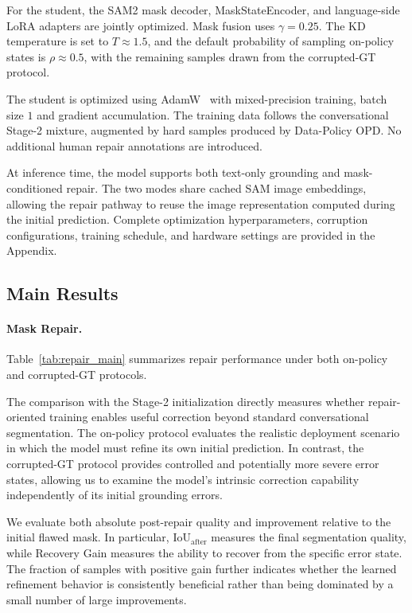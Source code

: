 For the student, the SAM2 mask decoder, MaskStateEncoder, and language-side LoRA adapters are jointly optimized.
Mask fusion uses $\gamma=0.25$.
The KD temperature is set to $T\approx1.5$, and the default probability of sampling on-policy states is $\rho\approx0.5$, with the remaining samples drawn from the corrupted-GT protocol.

The student is optimized using AdamW~\cite{loshchilov2019adamw} with mixed-precision training, batch size $1$ and gradient accumulation.
The training data follows the conversational Stage-2 mixture, augmented by hard samples produced by Data-Policy OPD.
No additional human repair annotations are introduced.

At inference time, the model supports both text-only grounding and mask-conditioned repair.
The two modes share cached SAM image embeddings, allowing the repair pathway to reuse the image representation computed during the initial prediction.
Complete optimization hyperparameters, corruption configurations, training schedule, and hardware settings are provided in the Appendix.


\subsection{Main Results}
\label{sec:main_results}

\paragraph{Mask Repair.}
Table~\ref{tab:repair_main} summarizes repair performance under both on-policy and corrupted-GT protocols.

The comparison with the Stage-2 initialization directly measures whether repair-oriented training enables useful correction beyond standard conversational segmentation.
The on-policy protocol evaluates the realistic deployment scenario in which the model must refine its own initial prediction.
In contrast, the corrupted-GT protocol provides controlled and potentially more severe error states, allowing us to examine the model's intrinsic correction capability independently of its initial grounding errors.

We evaluate both absolute post-repair quality and improvement relative to the initial flawed mask.
In particular, $\mathrm{IoU}_{\mathrm{after}}$ measures the final segmentation quality, while Recovery Gain measures the ability to recover from the specific error state.
The fraction of samples with positive gain further indicates whether the learned refinement behavior is consistently beneficial rather than being dominated by a small number of large improvements.

